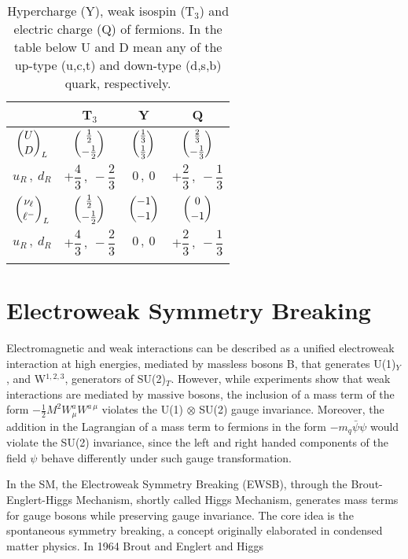 \begin{table}[th]
  \centering
  \caption{Hypercharge (Y), weak isospin (T$_3$) and electric charge (Q) of fermions. In the table below U and D mean any of the up-type (u,c,t) and down-type (d,s,b) quark, respectively.}
  \label{tab:charges}
  \begin{tabular}{ c c c c }
    \toprule
    & T$_3$ & Y & Q \\
    \midrule \addlinespace
    ${\dbinom{U}{D}}_L$             & $\dbinom{\frac{1}{2}}{-\frac{1}{2}}$ & $\dbinom{\frac{1}{3}}{\frac{1}{3}}$ & $\dbinom{\frac{2}{3}}{-\frac{1}{3}}$ \\ \addlinespace
    $u_R\, ,\  d_R$                 & $+\dfrac{4}{3}\, ,\  -\dfrac{2}{3}$  & $0\, ,\ 0$                          & $+\dfrac{2}{3}\, ,\  -\dfrac{1}{3}$  \\ \addlinespace
    \hline \addlinespace
    ${\dbinom{\nu_\ell}{\ell^-}}_L$ & $\dbinom{\frac{1}{2}}{-\frac{1}{2}}$ & $\dbinom{-1}{-1}$                   & $\dbinom{0}{-1}$                     \\ \addlinespace
    $u_R\, ,\  d_R$                 & $+\dfrac{4}{3}\, ,\  -\dfrac{2}{3}$  & $0\, ,\ 0$                          & $+\dfrac{2}{3}\, ,\  -\dfrac{1}{3}$  \\ \addlinespace
    \bottomrule
  \end{tabular}
\end{table}

\section{Electroweak Symmetry Breaking}
\label{EWSB}
Electromagnetic and weak interactions can be described as a unified electroweak interaction at high energies, mediated by massless bosons B, that generates U(1)$_Y$, and W$^{1, 2, 3}$, generators of SU(2)$_T$.
However, while experiments show that weak interactions are mediated by massive bosons, the inclusion of a mass term of the form $-\frac{1}{2} M^2 W^a_\mu W^{a\, \mu}$ violates the U(1) $\otimes$ SU(2) gauge invariance.
Moreover, the addition in the Lagrangian of a mass term to fermions in the form $-m_q \bar\psi \psi$ would violate the SU(2) invariance, since the left and right handed components of the field $\psi$ behave differently under such gauge transformation.

In the SM, the Electroweak Symmetry Breaking (EWSB), through the Brout-Englert-Higgs Mechanism, shortly called Higgs Mechanism, generates mass terms for gauge bosons while preserving gauge invariance.
The core idea is the spontaneous symmetry breaking, a concept originally elaborated in condensed matter physics.
In 1964 Brout and Englert \cite{PhysRevLett.13.321} and Higgs \cite{PhysRevLett.13.508, HIGGS1964132}

